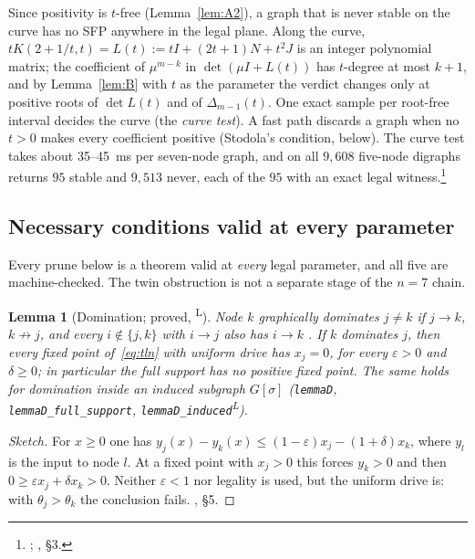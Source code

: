 \documentclass[11pt]{article}
\newtheorem{lemma}[theorem]{Lemma}
\theoremstyle{definition}
\newcommand{\eps}{\varepsilon}
\newcommand{\lean}{\textsuperscript{\textsf{L}}}
\begin{document}
Since positivity is $t$-free (Lemma~\ref{lem:A2}), a graph that is never stable on the curve has no SFP anywhere in
the legal plane. Along the curve, $tK(2+1/t,t)=L(t):=tI+(2t+1)N+t^2J$ is an integer polynomial matrix; the coefficient
of $\mu^{m-k}$ in $\det(\mu I+L(t))$ has $t$-degree at most $k+1$, and by Lemma~\ref{lem:B} with $t$ as the parameter
the verdict changes only at positive roots of $\det L(t)$ and of $\Delta_{m-1}(t)$. One exact sample per root-free
interval decides the curve (the \emph{curve test}). A fast path discards a graph when no $t>0$ makes every coefficient
positive (Stodola's condition, below). The curve test takes about 35--45~ms per seven-node graph, and on all $9{,}608$
five-node digraphs returns $95$ stable and $9{,}513$ never, each of the $95$ with an exact legal witness.\footnote{; , \S3.}

\subsection{Necessary conditions valid at every parameter}\label{sec:prunes}
Every prune below is a theorem valid at \emph{every} legal parameter, and all five are machine-checked. The twin
obstruction is not a separate stage of the $n=7$ chain.

\begin{lemma}[Domination; proved, \lean]\label{lem:D}
Node $k$ \emph{graphically dominates} $j\ne k$ if $j\to k$, $k\not\to j$, and every $i\notin\{j,k\}$ with $i\to j$ also has
$i\to k$ \cite[Def.~1.1]{Curto2025}. If $k$ dominates $j$, then every fixed point of~\eqref{eq:tln} with uniform drive has
$x_j=0$, for every $\eps>0$ and $\delta\ge0$; in particular the full support has no positive fixed point. The same holds
for domination inside an induced subgraph $G[\sigma]$ (\texttt{lemmaD}, \texttt{lemmaD\_full\_support}, \texttt{lemmaD\_induced}\lean).
\end{lemma}
\begin{proof}[Sketch]
For $x\ge0$ one has $y_j(x)-y_k(x)\le(1-\eps)x_j-(1+\delta)x_k$, where $y_l$ is the input to node $l$. At a fixed
point with $x_j>0$ this forces $y_k>0$ and then $0\ge\eps x_j+\delta x_k>0$. Neither $\eps<1$ nor legality is used, but
the uniform drive is: with $\theta_j>\theta_k$ the conclusion fails. , \S5.
\end{proof}
\end{document}
